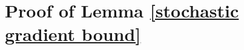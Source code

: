 \documentclass[10pt]{article} %
\def\eqref#1{equation~\ref{#1}}
\newtheorem{lemma}{Lemma}
\newtheorem{proof}{Proof}
\begin{document}
\newpage
\section{Proof of Lemma \ref{stochastic gradient bound}}\label{Appendix H}
\end{document}
